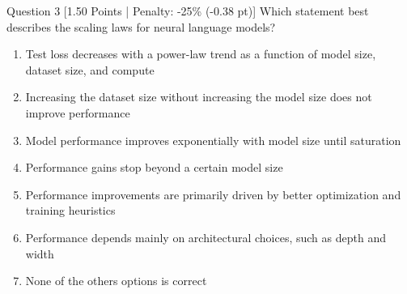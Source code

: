 \documentclass[11pt,a4paper]{article}
\begin{document}
\vspace{1.2em}

\begin{questionbox}{Question 3 \hfill [1.50 Points | Penalty: -25\% (-0.38 pt)]}
Which statement best describes the scaling laws for neural language models?

\begin{enumerate}[label=\alph*., leftmargin=2em]
    \item Test loss decreases with a power-law trend as a function of model size, dataset size, and compute
    \item Increasing the dataset size without increasing the model size does not improve performance
    \item Model performance improves exponentially with model size until saturation
    \item Performance gains stop beyond a certain model size
    \item Performance improvements are primarily driven by better optimization and training heuristics
    \item Performance depends mainly on architectural choices, such as depth and width
    \item None of the others options is correct
\end{enumerate}
\end{questionbox}

\vspace{1.2em}
\end{document}

